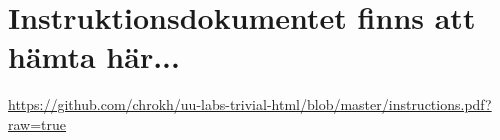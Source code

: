 \documentclass{article}
\begin{document}
  \title{ }
  \author{ }
  \date{}
  \maketitle


\section*{Instruktionsdokumentet finns att hämta här...}
\href{https://github.com/chrokh/uu-labs-trivial-html/blob/master/instructions.pdf?raw=true}{https://github.com/chrokh/uu-labs-trivial-html/blob/master/instructions.pdf?raw=true}
\end{document}
